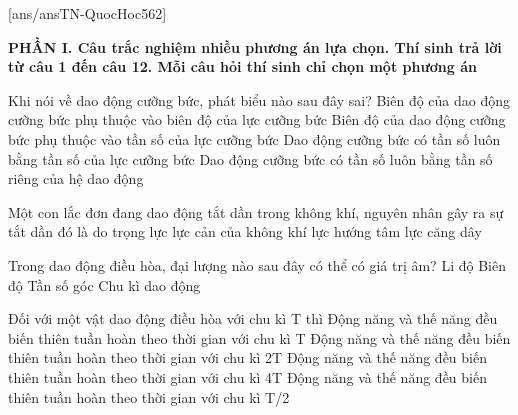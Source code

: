 [ans/ansTN-QuocHoc562]

\noindent \textbf{PHẦN I. Câu trắc nghiệm nhiều phương án lựa chọn. Thí sinh trả lời từ câu 1 đến câu 12. Mỗi câu hỏi thí sinh chỉ chọn một phương án}
\vspace{0.2cm}

\begin{ex}	Khi nói về dao động cưỡng bức, phát biểu nào sau đây sai?
	\choice
	{Biên độ của dao động cưỡng bức phụ thuộc vào biên độ của lực cưỡng bức}
	{Biên độ của dao động cưỡng bức phụ thuộc vào tần số của lực cưỡng bức}
	{Dao động cưỡng bức có tần số luôn bằng tần số của lực cưỡng bức}
	{\True Dao động cưỡng bức có tần số luôn bằng tần số riêng của hệ dao động}
\end{ex}

\begin{ex}	Một con lắc đơn đang dao động tắt dần trong không khí, nguyên nhân gây ra sự tắt dần đó là do
	\choice
	{trọng lực}
	{\True lực cản của không khí}
	{lực hướng tâm}
	{lực căng dây}
\end{ex}

\begin{ex}	Trong dao động điều hòa, đại lượng nào sau đây có thể có giá trị âm?
	\choice
	{\True Li độ}
	{Biên độ}
	{Tần số góc}
	{Chu kì dao động}
\end{ex}

\begin{ex}	Đối với một vật dao động điều hòa với chu kì T thì
	\choice
	{Động năng và thế năng đều biến thiên tuần hoàn theo thời gian với chu kì T}
	{Động năng và thế năng đều biến thiên tuần hoàn theo thời gian với chu kì 2T}
	{Động năng và thế năng đều biến thiên tuần hoàn theo thời gian với chu kì 4T}
	{\True Động năng và thế năng đều biến thiên tuần hoàn theo thời gian với chu kì T/2}
\end{ex}

